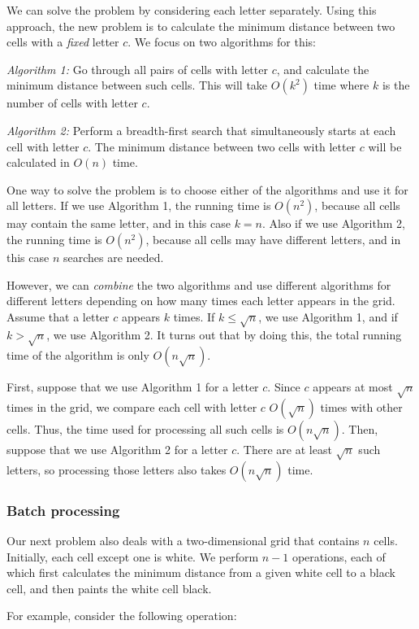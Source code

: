 We can solve the problem by considering each letter separately.
Using this approach, the new problem is to calculate
the minimum distance
between two cells with a \emph{fixed} letter $c$.
We focus on two algorithms for this:

\emph{Algorithm 1:} Go through all pairs of cells with letter $c$,
and calculate the minimum distance between such cells.
This will take $O(k^2)$ time where $k$ is the number of cells with letter $c$.

\emph{Algorithm 2:} Perform a breadth-first search that simultaneously
starts at each cell with letter $c$. The minimum distance between
two cells with letter $c$ will be calculated in $O(n)$ time.

One way to solve the problem is to choose either of the
algorithms and use it for all letters.
If we use Algorithm 1, the running time is $O(n^2)$,
because all cells may contain the same letter,
and in this case $k=n$.
Also if we use Algorithm 2, the running time is $O(n^2)$,
because all cells may have different letters,
and in this case $n$ searches are needed.

However, we can \emph{combine} the two algorithms and
use different algorithms for different letters
depending on how many times each letter appears in the grid.
Assume that a letter $c$ appears $k$ times.
If $k \le \sqrt n$, we use Algorithm 1, and if $k > \sqrt n$,
we use Algorithm 2.
It turns out that by doing this, the total running time
of the algorithm is only $O(n \sqrt n)$.

First, suppose that we use Algorithm 1 for a letter $c$.
Since $c$ appears at most $\sqrt n$ times in the grid,
we compare each cell with letter $c$ $O(\sqrt n)$ times
with other cells.
Thus, the time used for processing all such cells is $O(n \sqrt n)$.
Then, suppose that we use Algorithm 2 for a letter $c$.
There are at least $\sqrt n$ such letters,
so processing those letters also takes $O(n \sqrt n)$ time.

\subsubsection{Batch processing}

Our next problem also deals with
a two-dimensional grid that contains $n$ cells.
Initially, each cell except one is white.
We perform $n-1$ operations, each of which first
calculates the minimum distance from a given white cell
to a black cell, and then paints the white cell black.

For example, consider the following operation:

